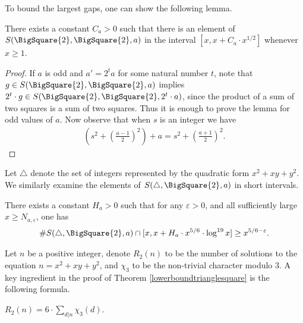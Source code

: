\documentclass[12pt]{amsart}
\newcommand{\1}{\mathmybb{1}}
\begin{document}
To bound the largest gaps, one can show the following lemma.
\begin{lem}
\label{Largestgapss2square}
There exists a constant $C_{a}>0$ such that there is an element of $S(\BigSquare{2},\BigSquare{2},a)$ in the interval $[x,x+C_{a}\cdot x^{1/2}]$ whenever $x \geq 1$.
\end{lem}
\begin{proof}
If $a$ is odd and $a' = 2^{t}a$ for some natural number $t$, note that $g \in S(\BigSquare{2},\BigSquare{2},a)$ implies $2^{t}\cdot g \in S(\BigSquare{2},\BigSquare{2},2^{t}\cdot a)$, since the product of a sum of two squares is a sum of two squares. Thus it is enough to prove the lemma for odd values of $a$. Now observe that when $s$ is an integer we have
\begin{align*}
\left(s^2 +\left(\frac{a-1}{2}\right)^2\right) +a= s^2 +\left(\frac{a+1}{2}\right)^2.
\end{align*}
\end{proof}
Let $\triangle$ denote the set of integers represented by the quadratic form $x^2+xy+y^2$. We similarly examine the elements of $S(\triangle,\BigSquare{2},a)$ in short intervals.
\begin{cor}
\label{lowerboundtrianglesquare}
There exists a constant $H_{a} > 0$ such that for any $\varepsilon>0$, and all sufficiently large $x \geq N_{a,\varepsilon}$, one has
\begin{align*}
\# S(\triangle,\BigSquare{2},a)\cap [x,x+H_{a}\cdot x^{5/6}\cdot \log^{19}x] \geq x^{5/6-\varepsilon}.
\end{align*}
\end{cor}
Let $n$ be a positive integer, denote $R_{2}(n)$ to be the number of solutions to the equation $n = x^2+xy+y^2$, and $\chi_{3}$ to be the non-trivial character modulo $3$. A key ingredient in the proof of Theorem \ref{lowerboundtrianglesquare} is the following formula.
\begin{lem}
\label{r3equality}
$R_{2}(n) = 6\cdot\sum_{d|n}\chi_{3}(d)$.
\end{lem}
\end{document}
